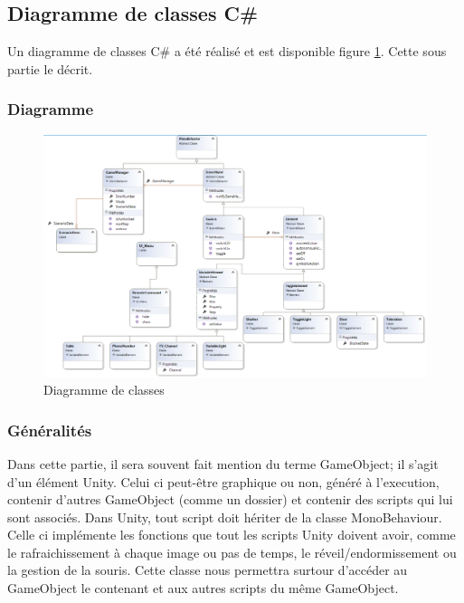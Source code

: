 \subsection{Diagramme de classes C\#}
Un diagramme de classes C# a été réalisé et est disponible figure \ref{fig:class_diagram}. Cette sous partie le décrit.
\subsubsection{Diagramme}
\begin{figure}
    \centering
    \includegraphics[width=\textwidth]{4-Conception/img/diagClasses.png}
    \caption{Diagramme de classes}
    \label{fig:class_diagram}
\end{figure}

\subsubsection{Généralités}
Dans cette partie, il sera souvent fait mention du terme GameObject; il s'agit d'un élément Unity. 
Celui ci peut-être graphique ou non, généré à l'execution, contenir d'autres GameObject (comme un dossier) et contenir des scripts qui lui sont associés.
\newline
Dans Unity, tout script doit hériter de la classe MonoBehaviour.
Celle ci implémente les fonctions que tout les scripts Unity doivent avoir, comme le rafraichissement à chaque image ou pas de temps, le réveil/endormissement ou la gestion de la souris.
Cette classe nous permettra surtour d'accéder au GameObject le contenant et aux autres scripts du même GameObject.

